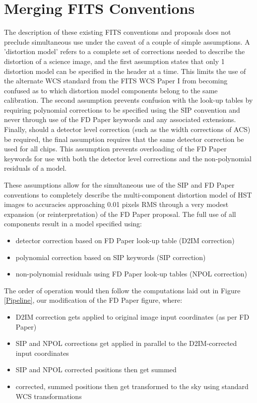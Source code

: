 \section{Merging FITS Conventions}
The description of these existing FITS conventions and proposals does not preclude simultaneous use under the caveat of a couple of simple assumptions.  A 'distortion model' refers to a complete set of corrections needed to describe the distortion of a science image, and the first assumption states that only 1 distortion model can be specified in the header at a time. This limits the use of the alternate WCS standard from the FITS WCS Paper I from becoming confused as to which distortion model components belong to the same calibration. The second assumption prevents confusion with the look-up tables by requiring polynomial corrections to be specified using the SIP convention and never through use of the FD Paper keywords and any associated extensions. Finally, should a detector level correction (such as the width corrections of ACS) be required, the final assumption requires that the same detector correction be used for all chips. This assumption prevents overloading of the FD Paper keywords for use with both the detector level corrections and the non-polynomial residuals of a model. 

These assumptions allow for the simultaneous use of the SIP and FD Paper conventions to completely describe the multi-component distortion model of HST images to accuracies approaching 0.01 pixels RMS through a very modest expansion (or reinterpretation) of the FD Paper proposal. The full use of all components result in a model specified using:
\begin{itemize}
\item detector correction based on FD Paper look-up table (D2IM correction)
\item polynomial correction based on SIP keywords (SIP correction)
\item non-polynomial residuals using FD Paper look-up tables (NPOL correction)
\end{itemize}
The order of operation would then follow the computations laid out in Figure \ref{Pipeline}, our modification of the FD Paper figure, where:
\begin{itemize}
\item D2IM correction gets applied to original image input coordinates (as per FD Paper)
\item SIP and NPOL corrections get applied in parallel to the D2IM-corrected input coordinates
\item SIP and NPOL corrected positions then get summed 
\item corrected, summed positions then get transformed to the sky using standard WCS transformations
\end{itemize}


